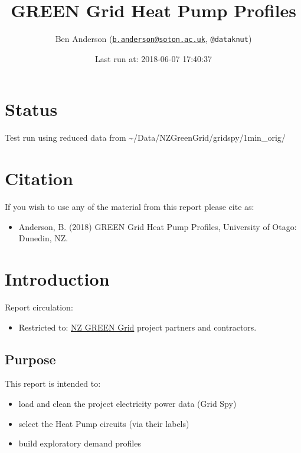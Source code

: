 \documentclass[]{article}
\title{GREEN Grid Heat Pump Profiles}
\author{Ben Anderson
(\href{mailto:b.anderson@soton.ac.uk}{\nolinkurl{b.anderson@soton.ac.uk}},
\texttt{@dataknut})}
\date{Last run at: 2018-06-07 17:40:37}
\providecommand{\tightlist}{%
  \setlength{\itemsep}{0pt}\setlength{\parskip}{0pt}}
\begin{document}
\maketitle

{
\setcounter{tocdepth}{2}
\tableofcontents
}
\newpage

\section{Status}\label{status}

Test run using reduced data from
\textasciitilde{}/Data/NZGreenGrid/gridspy/1min\_orig/

\section{Citation}\label{citation}

If you wish to use any of the material from this report please cite as:

\begin{itemize}
\tightlist
\item
  Anderson, B. (2018) GREEN Grid Heat Pump Profiles, University of
  Otago: Dunedin, NZ.
\end{itemize}

\newpage

\section{Introduction}\label{introduction}

Report circulation:

\begin{itemize}
\tightlist
\item
  Restricted to:
  \href{https://www.otago.ac.nz/centre-sustainability/research/energy/otago050285.html}{NZ
  GREEN Grid} project partners and contractors.
\end{itemize}

\subsection{Purpose}\label{purpose}

This report is intended to:

\begin{itemize}
\tightlist
\item
  load and clean the project electricity power data (Grid Spy)
\item
  select the Heat Pump circuits (via their labels)
\item
  build exploratory demand profiles
\end{itemize}
\end{document}
